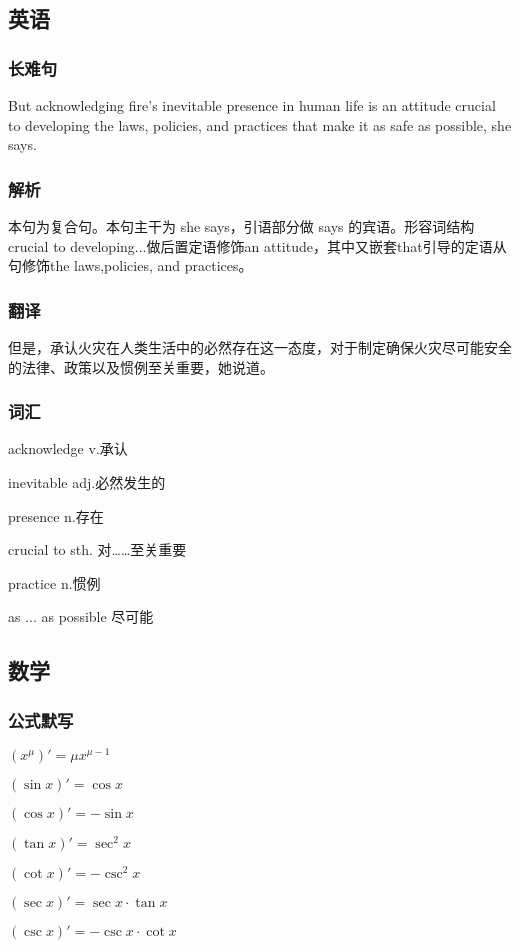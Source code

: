 \documentclass[UTF8]{ctexart}
\begin{document}
\subsection{英语}
\subsubsection{长难句}
But acknowledging fire's inevitable presence in human life is an attitude crucial to developing the laws, policies, and practices that make it as safe as possible, she says.
\subsubsection{解析}
本句为复合句。本句主干为 she says，引语部分做 says 的宾语。形容词结构 crucial to developing...做后置定语修饰an attitude，其中又嵌套that引导的定语从句修饰the laws,policies, and practices。
\subsubsection{翻译}
但是，承认火灾在人类生活中的必然存在这一态度，对于制定确保火灾尽可能安全的法律、政策以及惯例至关重要，她说道。
\subsubsection{词汇}
\begin{multicols}{2}
      acknowledge v.承认

      inevitable  adj.必然发生的

      presence  n.存在

      crucial to sth. 对……至关重要

      practice  n.惯例

      as ... as possible 尽可能
\end{multicols}
\subsection{数学}
\subsubsection{公式默写}
\begin{multicols}{3}
      ${(x^\mu)}'=\mu x^{\mu-1}$

      ${(\sin x)}'=\cos x$

      ${(\cos x)}'=-\sin x$

      ${(\tan x)}'=\sec^2 x$

      ${(\cot x)}'=-\csc^2 x$

      ${(\sec x)}'=\sec x\cdot\tan x$

      ${(\csc x)}'=-\csc x\cdot\cot x$
\end{multicols}
\end{document}
